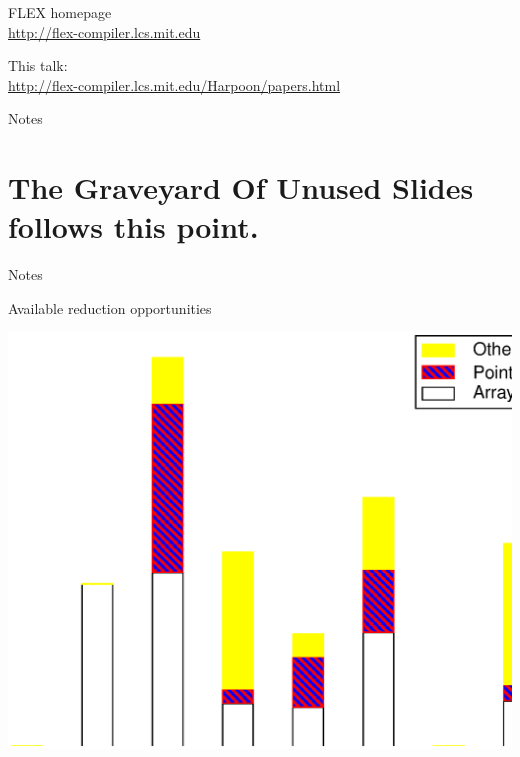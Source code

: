\documentclass[%
pdf,
colorBG,
slideColor,
nototal,
oqe
]{prosper}
\renewcommand{\yellow}{\colC}
\newenvironment{talknotes}{\begin{slide}{Notes}\tiny}{\end{slide}}
\begin{document}
\begin{slide}{}
\vspace{.5cm}
\begin{center}\end{center}

\vspace{1.2cm}
\begin{center}
FLEX homepage
\\
{\yellow
\href{http://flex-compiler.lcs.mit.edu}{http://flex-compiler.lcs.mit.edu}
}

\vspace{1cm}
This talk:
\\
{\yellow
\href{http://flex-compiler.lcs.mit.edu/Harpoon/papers.html}{http://flex-compiler.lcs.mit.edu/Harpoon/papers.html}
}
\end{center}
\end{slide}

\begin{talknotes}
\end{talknotes}

\part{The Graveyard Of Unused Slides follows this point.}

\begin{talknotes}
\end{talknotes}

\begin{slide}{Available reduction opportunities}
\begin{center}
\includegraphics[scale=0.45]{Figures/spec-space-2.eps}
\end{center}
\end{slide}
\end{document}
